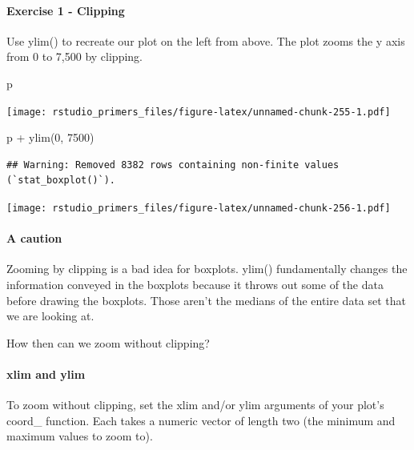\documentclass[
]{article}
\newenvironment{Shaded}{\begin{snugshade}}{\end{snugshade}}
\newcommand{\DecValTok}[1]{\textcolor[rgb]{0.00,0.00,0.81}{#1}}
\newcommand{\FunctionTok}[1]{\textcolor[rgb]{0.00,0.00,0.00}{#1}}
\newcommand{\NormalTok}[1]{#1}
\newcommand{\SpecialCharTok}[1]{\textcolor[rgb]{0.00,0.00,0.00}{#1}}
\begin{document}
\hypertarget{exercise-1---clipping}{%
\paragraph{Exercise 1 - Clipping}\label{exercise-1---clipping}}

Use ylim() to recreate our plot on the left from above. The plot zooms
the y axis from 0 to 7,500 by clipping.

\begin{Shaded}
\begin{Highlighting}[]
\NormalTok{p}
\end{Highlighting}
\end{Shaded}

\texttt{[image: rstudio\_primers\_files/figure-latex/unnamed-chunk-255-1.pdf]}

\begin{Shaded}
\begin{Highlighting}[]
\NormalTok{p }\SpecialCharTok{+} \FunctionTok{ylim}\NormalTok{(}\DecValTok{0}\NormalTok{, }\DecValTok{7500}\NormalTok{)}
\end{Highlighting}
\end{Shaded}

\begin{verbatim}
## Warning: Removed 8382 rows containing non-finite values (`stat_boxplot()`).
\end{verbatim}

\texttt{[image: rstudio\_primers\_files/figure-latex/unnamed-chunk-256-1.pdf]}

\hypertarget{a-caution}{%
\paragraph{A caution}\label{a-caution}}

Zooming by clipping is a bad idea for boxplots. ylim() fundamentally
changes the information conveyed in the boxplots because it throws out
some of the data before drawing the boxplots. Those aren't the medians
of the entire data set that we are looking at.

How then can we zoom without clipping?

\hypertarget{xlim-and-ylim-1}{%
\paragraph{xlim and ylim}\label{xlim-and-ylim-1}}

To zoom without clipping, set the xlim and/or ylim arguments of your
plot's coord\_ function. Each takes a numeric vector of length two (the
minimum and maximum values to zoom to).
\end{document}
